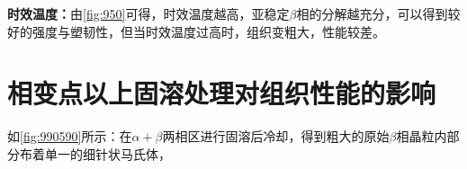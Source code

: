 \textbf{\faThermometerQuarter 时效温度：}由\ref{fig:950}可得，时效温度越高，亚稳定$ \beta $相的分解越充分，可以得到较好的强度与塑韧性，但当时效温度过高时，组织变粗大，性能较差。

\section{相变点以上固溶处理对组织性能的影响}
如\ref{fig:990590}所示：在$ \alpha+\beta $两相区进行固溶后冷却，得到粗大的原始$ \beta $相晶粒内部分布着单一的细针状马氏体，
\begin{figure}[htbp]
	\centering
\end{figure}
